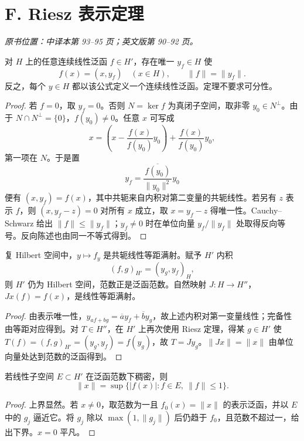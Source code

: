 \section{F. Riesz 表示定理}\label{sec:yosida-03-06}
\noindent\textit{原书位置：中译本第 93--95 页；英文版第 90--92 页。}

\begin{theorem}\label{thm:y3-riesz-representation}
对 $H$ 上的任意连续线性泛函 $f\in H'$，存在唯一 $y_f\in H$ 使
\[
 f(x)=(x,y_f)\quad(x\in H),\qquad \|f\|=\|y_f\|.
\]
反之，每个 $y\in H$ 都以该公式定义一个连续线性泛函。定理不要求可分性。
\end{theorem}
\begin{proof}
若 $f=0$，取 $y_f=0$。否则 $N=\ker f$ 为真闭子空间，取非零 $y_0\in N^\perp$。由于 $N\cap N^\perp=\{0\}$，$f(y_0)\ne0$。任意 $x$ 可写成
\[
 x=\left(x-\frac{f(x)}{f(y_0)}y_0\right)
       +\frac{f(x)}{f(y_0)}y_0,
\]
第一项在 $N$。于是置
\[
 y_f=\frac{\overline{f(y_0)}}{\|y_0\|^2}y_0
\]
便有 $(x,y_f)=f(x)$，其中共轭来自内积对第二变量的共轭线性。若另有 $z$ 表示 $f$，则 $(x,y_f-z)=0$ 对所有 $x$ 成立，取 $x=y_f-z$ 得唯一性。Cauchy--Schwarz 给出 $\|f\|\le\|y_f\|$；$y_f\ne0$ 时在单位向量 $y_f/\|y_f\|$ 处取得反向等号。反向陈述也由同一不等式得到。
\end{proof}

\begin{corollary}\label{cor:y3-reflexive}
复 Hilbert 空间中，$y\mapsto f_y$ 是共轭线性等距满射。赋予 $H'$ 内积
\[
 (f,g)_{H'}=(y_g,y_f)_H,
\]
则 $H'$ 仍为 Hilbert 空间，范数正是泛函范数。自然映射 $J:H\to H''$，$Jx(f)=f(x)$，是线性等距满射。
\end{corollary}
\begin{proof}
由表示唯一性，$y_{af+bg}=\overline a y_f+\overline b y_g$，故上述内积对第一变量线性；完备性由等距对应得到。对 $T\in H''$，在 $H'$ 上再次使用 Riesz 定理，得某 $g\in H'$ 使
$T(f)=(f,g)_{H'}=(y_g,y_f)=f(y_g)$，故 $T=Jy_g$。$\|Jx\|=\|x\|$ 由单位向量处达到范数的泛函得到。
\end{proof}

\begin{corollary}[稠密泛函族决定范数]\label{cor:y3-dense-dual}
若线性子空间 $E\subset H'$ 在泛函范数下稠密，则
\[
 \|x\|=\sup\{|f(x)|:f\in E,\ \|f\|\le1\}.
\]
\end{corollary}
\begin{proof}
上界显然。若 $x\ne0$，取范数为一且 $f_0(x)=\|x\|$ 的表示泛函，并以 $E$ 中的 $g_j$ 逼近它。将 $g_j$ 除以 $\max(1,\|g_j\|)$ 后仍趋于 $f_0$，且范数不超过一，给出下界。$x=0$ 平凡。
\end{proof}

